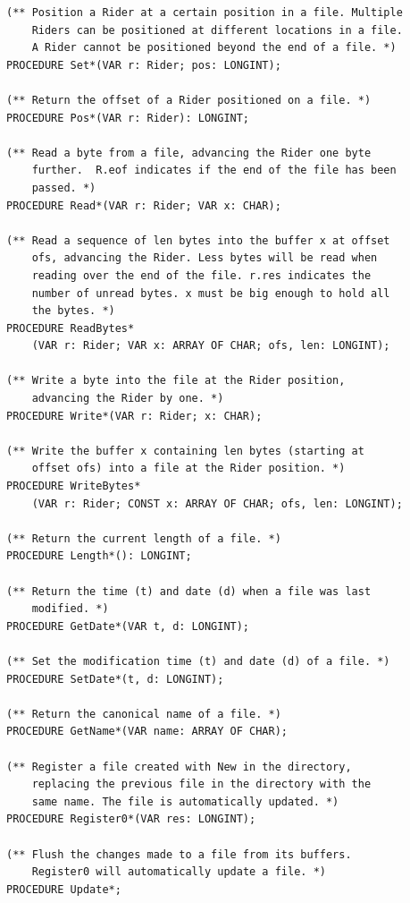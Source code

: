 \documentclass[11pt,a4paper]{book}
\begin{document}
\begin{verbatim}
(** Position a Rider at a certain position in a file. Multiple
    Riders can be positioned at different locations in a file.
    A Rider cannot be positioned beyond the end of a file. *)		
PROCEDURE Set*(VAR r: Rider; pos: LONGINT);

(** Return the offset of a Rider positioned on a file. *)
PROCEDURE Pos*(VAR r: Rider): LONGINT;

(** Read a byte from a file, advancing the Rider one byte
    further.  R.eof indicates if the end of the file has been
    passed. *)
PROCEDURE Read*(VAR r: Rider; VAR x: CHAR);

(** Read a sequence of len bytes into the buffer x at offset
    ofs, advancing the Rider. Less bytes will be read when
    reading over the end of the file. r.res indicates the
    number of unread bytes. x must be big enough to hold all
    the bytes. *)
PROCEDURE ReadBytes*
    (VAR r: Rider; VAR x: ARRAY OF CHAR; ofs, len: LONGINT);

(** Write a byte into the file at the Rider position,
    advancing the Rider by one. *)
PROCEDURE Write*(VAR r: Rider; x: CHAR);

(** Write the buffer x containing len bytes (starting at 
    offset ofs) into a file at the Rider position. *)
PROCEDURE WriteBytes*
    (VAR r: Rider; CONST x: ARRAY OF CHAR; ofs, len: LONGINT);

(** Return the current length of a file. *)
PROCEDURE Length*(): LONGINT;

(** Return the time (t) and date (d) when a file was last
    modified. *)
PROCEDURE GetDate*(VAR t, d: LONGINT);

(** Set the modification time (t) and date (d) of a file. *)
PROCEDURE SetDate*(t, d: LONGINT);

(** Return the canonical name of a file. *)
PROCEDURE GetName*(VAR name: ARRAY OF CHAR);

(** Register a file created with New in the directory,
    replacing the previous file in the directory with the
    same name. The file is automatically updated. *)
PROCEDURE Register0*(VAR res: LONGINT);

(** Flush the changes made to a file from its buffers. 
    Register0 will automatically update a file. *) 
PROCEDURE Update*;
\end{verbatim}
\end{document}
